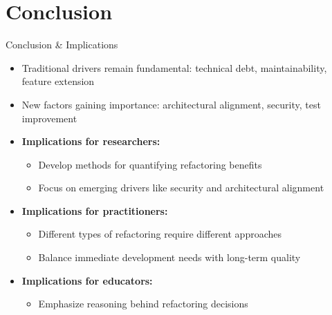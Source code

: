 \documentclass{beamer}
\begin{document}
\section{Conclusion}
\begin{frame}{Conclusion \& Implications}
    \begin{itemize}
        \item Traditional drivers remain fundamental: technical debt, maintainability, feature extension
        \item New factors gaining importance: architectural alignment, security, test improvement
        \item \textbf{Implications for researchers:}
            \begin{itemize}
                \item Develop methods for quantifying refactoring benefits
                \item Focus on emerging drivers like security and architectural alignment
            \end{itemize}
        \item \textbf{Implications for practitioners:}
            \begin{itemize}
                \item Different types of refactoring require different approaches
                \item Balance immediate development needs with long-term quality
            \end{itemize}
        \item \textbf{Implications for educators:}
            \begin{itemize}
                \item Emphasize reasoning behind refactoring decisions
            \end{itemize}
    \end{itemize}
\end{frame}
\end{document}
